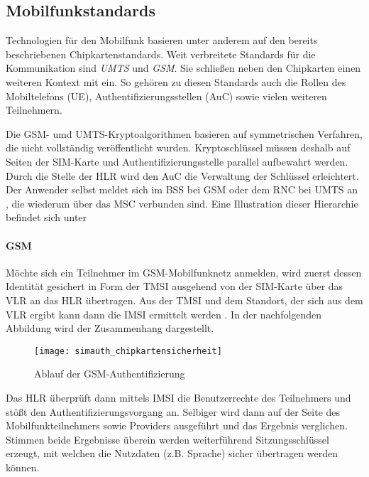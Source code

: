 \clearpage

\subsection[Mobilfunkstandards (Schenkel)]{Mobilfunkstandards} %
Technologien für den Mobilfunk basieren unter anderem auf den bereits beschriebenen
Chipkartenstandards. Weit verbreitete Standards für die Kommunikation sind
\textit{UMTS} und \textit{GSM}. Sie schließen neben den Chipkarten einen weiteren
Kontext mit ein. So gehören zu diesen Standards auch die Rollen des Mobiltelefons (UE),
Authentifizierungsstellen (\ac{AuC}) sowie vielen weiteren Teilnehmern.

Die GSM- umd UMTS-Kryptoalgorithmen basieren auf symmetrischen Verfahren, die nicht
vollständig veröffentlicht wurden. Kryptoschlüssel müssen deshalb auf
Seiten der SIM-Karte und Authentifizierungsstelle parallel aufbewahrt werden.
Durch die Stelle der \ac{HLR} wird den \ac{AuC} die Verwaltung der Schlüssel erleichtert.
Der Anwender selbst meldet sich im \ac{BSS} bei GSM oder dem \ac{RNC} bei UMTS an \cite{spitz11},
die wiederum über das \ac{MSC} verbunden sind. Eine Illustration dieser Hierarchie
befindet sich unter 

\paragraph{GSM}
Möchte sich ein Teilnehmer im GSM-Mobilfunknetz anmelden, wird zuerst dessen Identität
gesichert in Form der \ac{TMSI} ausgehend von der SIM-Karte über das \ac{VLR} an das
\ac{HLR} übertragen. Aus der \ac{TMSI} und dem Standort, der sich aus dem \ac{VLR}
ergibt kann dann die \ac{IMSI} ermittelt werden \cite{spitz11}. In der
nachfolgenden Abbildung wird der Zusammenhang dargestellt.

\begin{figure}[htp]
 \begin{center}
  \texttt{[image: simauth\_chipkartensicherheit]}
 \end{center}
 \caption[Ablauf der GSM-Authentifizierung]{Ablauf der GSM-Authentifizierung \cite{spitz11}}
 \label{abb:simauth}
\end{figure}

Das \ac{HLR} überprüft dann mittels \ac{IMSI} die Benutzerrechte des Teilnehmers und
stößt den Authentifizierungsvorgang an. Selbiger wird dann auf der Seite des
Mobilfunkteilnehmers sowie Providers ausgeführt und das Ergebnis verglichen.
Stimmen beide Ergebnisse überein werden weiterführend Sitzungsschlüssel erzeugt,
mit welchen die Nutzdaten (z.B. Sprache) sicher übertragen werden können.

